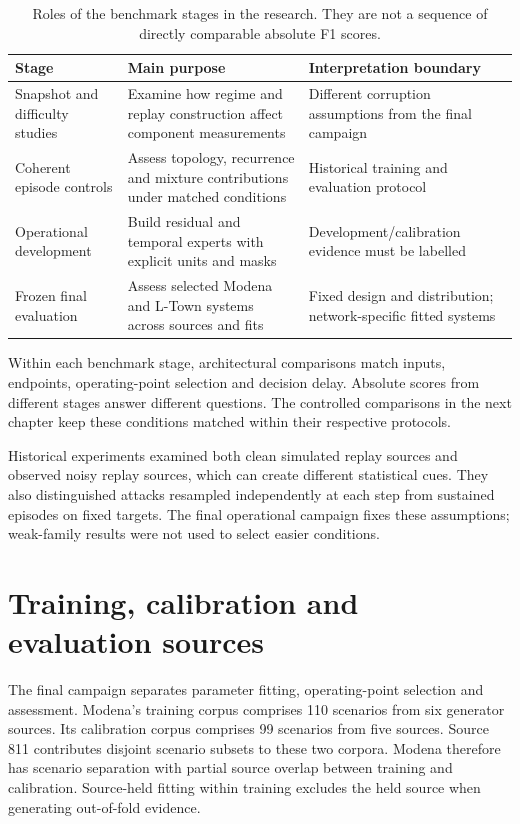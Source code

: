 \begin{table}[tbp]
\centering\small
\caption[Roles of the benchmark stages in the research]{Roles of the benchmark stages in the research. They are not a sequence of directly comparable absolute F1 scores.}
\label{tab:regimes}
\begin{tabularx}{\linewidth}{@{}lYY@{}}
\toprule
Stage & Main purpose & Interpretation boundary\\
\midrule
Snapshot and difficulty studies & Examine how regime and replay construction affect component measurements & Different corruption assumptions from the final campaign\\
Coherent episode controls & Assess topology, recurrence and mixture contributions under matched conditions & Historical training and evaluation protocol\\
Operational development & Build residual and temporal experts with explicit units and masks & Development/calibration evidence must be labelled\\
Frozen final evaluation & Assess selected Modena and L-Town systems across sources and fits & Fixed design and distribution; network-specific fitted systems\\
\bottomrule
\end{tabularx}
\end{table}

Within each benchmark stage, architectural comparisons match inputs, endpoints, operating-point selection and decision delay. Absolute scores from different stages answer different questions. The controlled comparisons in the next chapter keep these conditions matched within their respective protocols.

Historical experiments examined both clean simulated replay sources and observed noisy replay sources, which can create different statistical cues. They also distinguished attacks resampled independently at each step from sustained episodes on fixed targets. The final operational campaign fixes these assumptions; weak-family results were not used to select easier conditions.

\section{Training, calibration and evaluation sources}
The final campaign separates parameter fitting, operating-point selection and assessment. Modena's training corpus comprises 110 scenarios from six generator sources. Its calibration corpus comprises 99 scenarios from five sources. Source 811 contributes disjoint scenario subsets to these two corpora. Modena therefore has scenario separation with partial source overlap between training and calibration. Source-held fitting within training excludes the held source when generating out-of-fold evidence.

